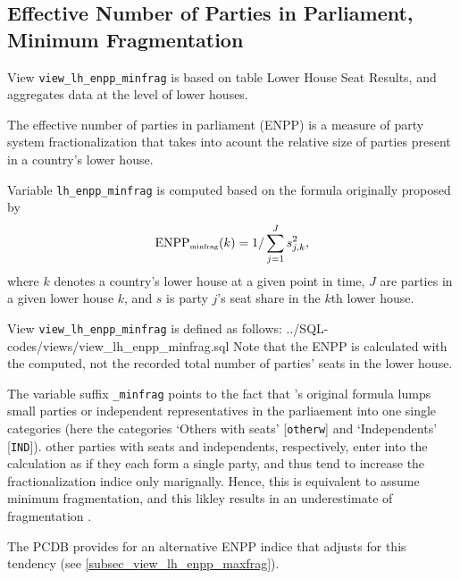 \subsection{Effective Number of Parties in Parliament, Minimum Fragmentation}\label{subsec_view_lh_enpp_minfrag}
View \texttt{view\_lh\_enpp\_minfrag} is based on table Lower House Seat Results, and aggregates data at the level of lower houses.

The effective number of parties in parliament (ENPP) is a measure of party system fractionalization that takes into acount the relative size of parties present in a country's lower house. 

Variable \texttt{lh\_enpp\_minfrag} is computed based on the formula originally proposed by \citet{Laakso&Taagepera1979}
\begin{equation}\label{ENPP_equ_minfrag}
\mbox{ENPP}_{\mbox{\tiny minfrag}}(k) = 1/\sum\limits_{j=1}^{J}s_{j,k}^{2},
\end{equation}
where $k$ denotes a country's lower house at a given point in time, $J$ are parties in a given lower house $k$, and $s$ is party $j$'s seat share in the $k$th lower house. 

View \texttt{view\_lh\_enpp\_minfrag} is defined as follows:
%
{../SQL-codes/views/view_lh_enpp_minfrag.sql}
Note that the ENPP is calculated with the computed, not the recorded total number of parties' seats in the lower house.

The variable suffix \texttt{\_minfrag} points to the fact that \citeauthor{Laakso&Taagepera1979}'s original formula lumps small parties or independent representatives in the parliaement into one single categories (here the categories `Others with seats' [\texttt{otherw}] and `Independents' [\texttt{IND}]). 
other parties with seats and independents, respectively, enter into the calculation as if they each form a single party, and thus tend to increase the fractionalization indice only marignally. 
Hence, this is equivalent to assume minimum fragmentation, and this likley results in an underestimate of fragmentation \citep[cf.][]{Gallagher&Mitchell2005}.

The PCDB provides for an alternative ENPP indice that adjusts for this tendency (see \ref{subsec_view_lh_enpp_maxfrag}).



